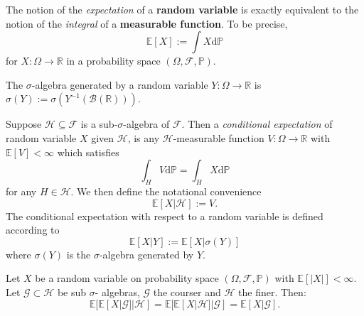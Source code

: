 \begin{definition}[Expectation]
    The notion of the \emph{expectation} of a \textbf{random variable} is exactly equivalent
    to the notion of the \emph{integral} of a \textbf{measurable function}.
    To be precise,
    \begin{equation*}
        \mathbb{E}[X]:=\int X\mathrm d\mathbb{P}
    \end{equation*}
    for $X:\Omega\rightarrow\mathbb{R}$ in a probability space $(\Omega,\mathcal{F},\mathbb{P})$.
\end{definition}

\begin{definition}
    The $\sigma$-algebra generated by a random variable $Y:\Omega\rightarrow\mathbb{R}$
    is $\sigma(Y):=\sigma(Y^{-1}(\mathcal{B}(\mathbb{R})))$.
\end{definition}

\begin{definition}
    Suppose $\mathcal{H}\subseteq\mathcal{F}$ is a sub-$\sigma$-algebra
    of $\mathcal{F}.$ Then a \emph{conditional expectation} of random variable
    $X$ given $\mathcal{H}$, is any $\mathcal{H}$-measurable function 
    $V:\Omega\rightarrow\mathbb{R}$ with $\mathbb{E}[V]<\infty$ which satisfies
    \begin{equation*}
        \int_H V\mathrm d\mathbb{P}=\int_H X\mathrm d\mathbb{P}
    \end{equation*}
    for any $H\in\mathcal{H}$. We then define the notational convenience
    \begin{equation*}
        \mathbb{E}[X|\mathcal{H}]:=V.
    \end{equation*}
    The conditional expectation with respect to a random variable is defined according
    to
    \begin{equation*}
        \mathbb{E}[X|Y]:=\mathbb{E}[X|\sigma(Y)]
    \end{equation*}
    where $\sigma(Y)$ is the $\sigma$-algebra generated by $Y$.
\end{definition}

\begin{theorem}
    Let $X$ be a random variable on probability space $(\Omega,\mathcal{F},\mathbb{P})$
    with $\mathbb{E}[|X|]<\infty$. Let $\mathcal{G}\subset\mathcal{H}$ be sub $\sigma$-
    algebras, $\mathcal{G}$ the courser and $\mathcal{H}$ the finer. Then:
    \begin{equation*}
        \mathbb{E}[\mathbb{E}[X|\mathcal{G}]|\mathcal{H}]=\mathbb{E}[\mathbb{E}[X|\mathcal{H}]|\mathcal{G}]=\mathbb{E}[X|\mathcal{G}].
    \end{equation*}
\end{theorem}

